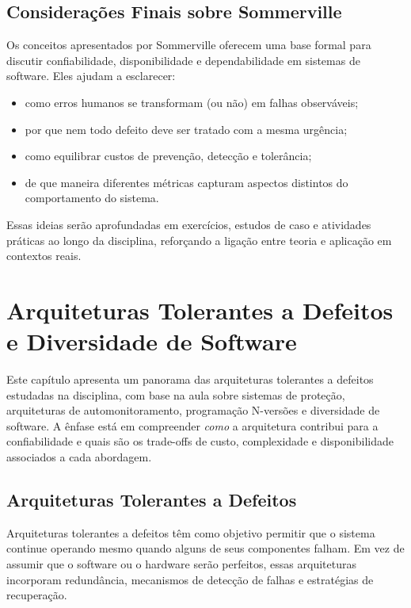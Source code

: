 \documentclass[12pt,a4paper]{report}
\begin{document}
\section{Considerações Finais sobre Sommerville}

Os conceitos apresentados por Sommerville oferecem uma base formal para
discutir confiabilidade, disponibilidade e dependabilidade em sistemas de
software. Eles ajudam a esclarecer:
\begin{itemize}[nosep]
    \item como erros humanos se transformam (ou não) em falhas observáveis;
    \item por que nem todo defeito deve ser tratado com a mesma urgência;
    \item como equilibrar custos de prevenção, detecção e tolerância;
    \item de que maneira diferentes métricas capturam aspectos distintos do
    comportamento do sistema.
\end{itemize}

Essas ideias serão aprofundadas em exercícios, estudos de caso e atividades
práticas ao longo da disciplina, reforçando a ligação entre teoria e
aplicação em contextos reais.

\clearpage

\chapter{Arquiteturas Tolerantes a Defeitos e Diversidade de Software}

Este capítulo apresenta um panorama das arquiteturas tolerantes a defeitos
estudadas na disciplina, com base na aula sobre sistemas de proteção,
arquiteturas de automonitoramento, programação N-versões e diversidade de
software. A ênfase está em compreender \emph{como} a arquitetura contribui
para a confiabilidade e quais são os trade-offs de custo, complexidade e
disponibilidade associados a cada abordagem.

\section{Arquiteturas Tolerantes a Defeitos}

Arquiteturas tolerantes a defeitos têm como objetivo permitir que o sistema
continue operando mesmo quando alguns de seus componentes falham. Em vez de
assumir que o software ou o hardware serão perfeitos, essas arquiteturas
incorporam redundância, mecanismos de detecção de falhas e estratégias de
recuperação.
\end{document}
